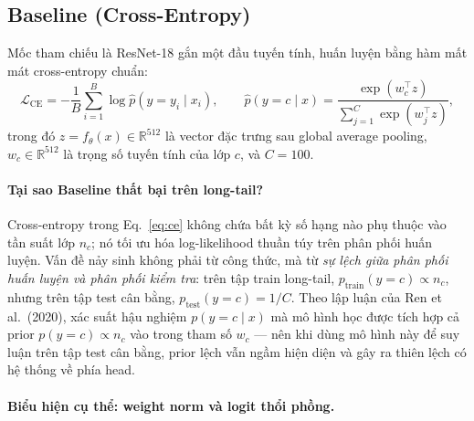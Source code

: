 \subsection{Baseline (Cross-Entropy)}

Mốc tham chiếu là ResNet-18 gắn một đầu tuyến tính, huấn luyện bằng hàm mất mát
cross-entropy chuẩn:
\begin{equation}
    \mathcal{L}_{\text{CE}}
    = -\frac{1}{B}\sum_{i=1}^{B} \log \hat{p}(y = y_i \mid x_i),
    \qquad
    \hat{p}(y = c \mid x) = \frac{\exp(w_c^\top z)}{\sum_{j=1}^{C}\exp(w_j^\top z)},
    \label{eq:ce}
\end{equation}
trong đó $z = f_\theta(x) \in \mathbb{R}^{512}$ là vector đặc trưng sau global average pooling,
$w_c \in \mathbb{R}^{512}$ là trọng số tuyến tính của lớp $c$, và $C = 100$.

\paragraph{Tại sao Baseline thất bại trên long-tail?}

Cross-entropy trong Eq.~\eqref{eq:ce} không chứa bất kỳ số hạng nào phụ thuộc vào
tần suất lớp $n_c$; nó tối ưu hóa log-likelihood thuần túy trên phân phối huấn luyện.
Vấn đề nảy sinh không phải từ công thức, mà từ \emph{sự lệch giữa phân phối huấn luyện
và phân phối kiểm tra}: trên tập train long-tail, $p_{\text{train}}(y=c) \propto n_c$, nhưng
trên tập test cân bằng, $p_{\text{test}}(y=c) = 1/C$.
Theo lập luận của Ren et al.\ (2020), xác suất hậu nghiệm $p(y=c \mid x)$ mà mô hình
học được tích hợp cả prior $p(y=c) \propto n_c$ vào trong tham số $w_c$ ---
nên khi dùng mô hình này để suy luận trên tập test cân bằng, prior lệch vẫn
ngầm hiện diện và gây ra thiên lệch có hệ thống về phía head.

\paragraph{Biểu hiện cụ thể: weight norm và logit thổi phồng.}

